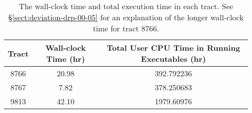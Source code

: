 \begin{table}
    \caption{The wall-clock time and total execution time in each tract.
    See \S\ref{sect:deviation-drp-00-05} for an explanation of the longer wall-clock time for tract 8766.}
    \label{tab:runtime}
    \small
    \begin{center}
    \begin{tabular}{ccc}
        \hline\hline
        \textbf{Tract}                                           &
        \textbf{Wall-clock Time (hr)}                            &
        \textbf{Total User CPU Time in Running Executables (hr)} \\
        \hline\hline
        8766 & 20.98 & 392.792236 \\
        8767 &  7.82 & 378.250683 \\
        9813 & 42.10 & 1979.60976 \\
        \hline\hline
    \end{tabular}
    \end{center}
\end{table}
